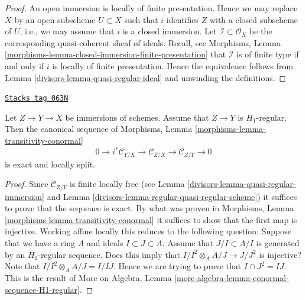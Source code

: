 \begin{proof}

An open immersion is locally of finite presentation. Hence we may
replace $X$ by an open subscheme $U \subset X$ such that $i$ identifies
$Z$ with a closed subscheme of $U$, i.e., we may assume that $i$
is a closed immersion. Let $\mathcal{I} \subset \mathcal{O}_X$ be the
corresponding quasi-coherent sheaf of ideals. Recall, see
Morphisms, Lemma \ref{morphisms-lemma-closed-immersion-finite-presentation}
that $\mathcal{I}$ is of finite type if and only if $i$ is locally
of finite presentation. Hence the equivalence follows from
Lemma \ref{divisors-lemma-quasi-regular-ideal}
and unwinding the definitions.
\end{proof}

\begin{lemma}
\label{divisors-lemma-transitivity-conormal-quasi-regular}
\href{https://stacks.math.columbia.edu/tag/063N}{\texttt{Stacks tag 063N}}

Let $Z \to Y \to X$ be immersions of schemes. Assume that
$Z \to Y$ is $H_1$-regular. Then the canonical sequence of
Morphisms, Lemma \ref{morphisms-lemma-transitivity-conormal}
$$
0 \to i^*\mathcal{C}_{Y/X} \to
\mathcal{C}_{Z/X} \to
\mathcal{C}_{Z/Y} \to 0
$$
is exact and locally split.
\end{lemma}

\begin{proof}

Since $\mathcal{C}_{Z/Y}$ is finite locally free (see
Lemma \ref{divisors-lemma-quasi-regular-immersion}
and
Lemma \ref{divisors-lemma-regular-quasi-regular-scheme})
it suffices to prove that the sequence is exact. By what was proven in
Morphisms, Lemma \ref{morphisms-lemma-transitivity-conormal}
it suffices to show that the first map is injective.
Working affine locally this reduces to the following question:
Suppose that we have a ring $A$ and ideals $I \subset J \subset A$.
Assume that $J/I \subset A/I$ is generated by an $H_1$-regular sequence.
Does this imply that $I/I^2 \otimes_A A/J \to J/J^2$ is injective?
Note that $I/I^2 \otimes_A A/J = I/IJ$. Hence we are trying to prove
that $I \cap J^2 = IJ$. This is the result of
More on Algebra, Lemma \ref{more-algebra-lemma-conormal-sequence-H1-regular}.
\end{proof}

